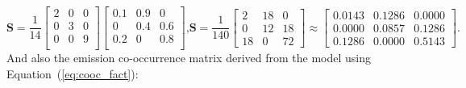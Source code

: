 \documentclass[shortabstract]{iithesis}
\begin{document}
\begin{subequations}
\begin{equation*}
    \textbf{S} = \frac 1 {14} \left [ \begin{array}{ccc}
        2 & 0 & 0 \\ 0 & 3 & 0 \\ 0 & 0 & 9 \\
    \end{array} \right ] \left[\begin{array}{ccc}
        0.1 & 0.9 & 0 \\
        0 & 0.4 & 0.6 \\
        0.2 & 0 & 0.8 \\
    \end{array}\right]\text{,}
\end{equation*}
\begin{equation} \label{eq:s_example}
    \textbf{S}= \frac 1 {140} \left [ \begin{array}{ccc}
        2 &  18 &  0 \\
        0 &  12  &  18 \\
        18 &  0  &  72 
    \end{array} \right ] \approx \left[ 
        \begin{array}{ccc}
      0.0143 &  0.1286 &  0.0000\\
      0.0000 &  0.0857 &  0.1286\\
      0.1286 &  0.0000 &  0.5143
    \end{array}
    \right ]\text{.}
\end{equation}
\end{subequations}
\linebreak
And also the emission co-occurrence matrix derived from the model using Equation~(\ref{eq:cooc_fact}):
\end{document}
